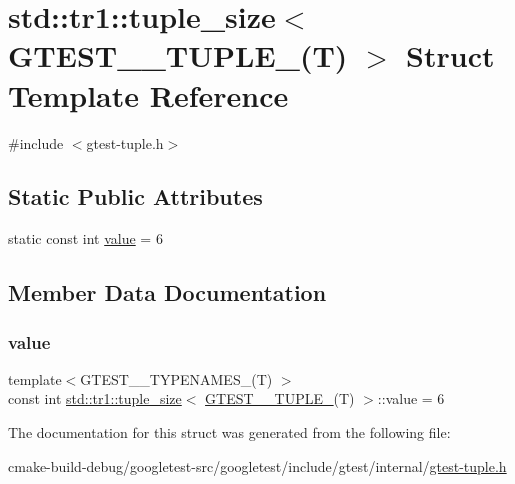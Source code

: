 \hypertarget{structstd_1_1tr1_1_1tuple__size_3_01GTEST__6__TUPLE___07T_08_01_4}{}\section{std\+::tr1\+::tuple\+\_\+size$<$ G\+T\+E\+S\+T\+\_\+\_\+\+T\+U\+P\+L\+E\+\_\+(T) $>$ Struct Template Reference}
\label{structstd_1_1tr1_1_1tuple__size_3_01GTEST__6__TUPLE___07T_08_01_4}


{\ttfamily \#include $<$gtest-\/tuple.\+h$>$}

\subsection*{Static Public Attributes}
\begin{DoxyCompactItemize}
\item 
static const int \mbox{\hyperlink{structstd_1_1tr1_1_1tuple__size_3_01GTEST__6__TUPLE___07T_08_01_4_a8c6740533d301f5d47f86ef5370a4b06}{value}} = 6
\end{DoxyCompactItemize}


\subsection{Member Data Documentation}
\mbox{\label{structstd_1_1tr1_1_1tuple__size_3_01GTEST__6__TUPLE___07T_08_01_4_a8c6740533d301f5d47f86ef5370a4b06}} 
\subsubsection{\texorpdfstring{value}{value}}
{\footnotesize\ttfamily template$<$G\+T\+E\+S\+T\+\_\+\_\+\+T\+Y\+P\+E\+N\+A\+M\+E\+S\+\_\+(\+T) $>$ \\
const int \mbox{\hyperlink{structstd_1_1tr1_1_1tuple__size}{std\+::tr1\+::tuple\+\_\+size}}$<$ \mbox{\hyperlink{namespacestd_1_1tr1_a485b05fdbbcfcf7ad5e4234e17702268}{G\+T\+E\+S\+T\+\_\+\_\+\+T\+U\+P\+L\+E\+\_\+}}(T) $>$\+::value = 6\hspace{0.3cm}{\ttfamily [static]}}



The documentation for this struct was generated from the following file\+:\begin{DoxyCompactItemize}
\item 
cmake-\/build-\/debug/googletest-\/src/googletest/include/gtest/internal/\mbox{\hyperlink{gtest-tuple_8h}{gtest-\/tuple.\+h}}\end{DoxyCompactItemize}

